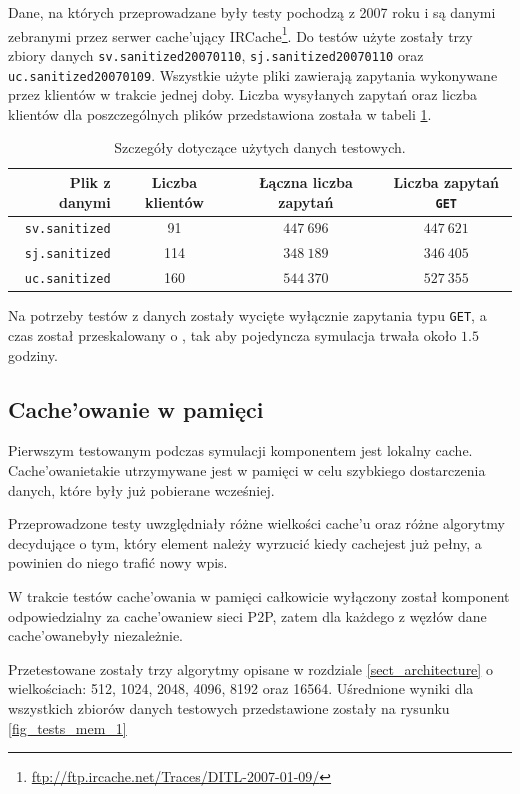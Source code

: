 \documentclass[a4paper,11pt]{scrartcl}
\newcommand{\f}{\texttt}
\newcommand{\s}{ }
\newcommand{\kesz}{cache}
\newcommand{\keszu}{cache'u}
\newcommand{\keszujacy}{cache'ujący}
\newcommand{\keszowania}{cache'owania}
\newcommand{\keszowane}{cache'owane}
\newcommand{\keszowanie}{cache'owanie}
\newcommand{\Keszowanie}{Cache'owanie}
\begin{document}
Dane, na których przeprowadzane były testy pochodzą z 2007 roku i są danymi zebranymi przez serwer \keszujacy\s IRCache\footnote{\url{ftp://ftp.ircache.net/Traces/DITL-2007-01-09/}}. Do testów użyte zostały trzy zbiory danych \f{sv.sanitized20070110}, \f{sj.sanitized20070110} oraz \f{uc.sanitized20070109}.
Wszystkie użyte pliki zawierają zapytania wykonywane przez klientów w trakcie jednej doby. Liczba wysyłanych zapytań oraz liczba klientów dla poszczególnych plików przedstawiona została w tabeli \ref{tab_testdata}.

\begin{table}[h!]
\centering
\begin{tabular}{r c c c}
Plik z danymi & Liczba klientów & Łączna liczba zapytań & Liczba zapytań \f{GET}\\
\hline
\f{sv.sanitized} & 91 & $447~696$ & $447~621$\\
\f{sj.sanitized} & 114 & $348~189$ & $346~405$\\
\f{uc.sanitized} & 160 & $544~370$ & $527~355$\\
\end{tabular}
\caption{Szczegóły dotyczące użytych danych testowych.}
\label{tab_testdata}
\end{table}

Na potrzeby testów z danych zostały wycięte wyłącznie zapytania typu \f{GET}, a czas został przeskalowany o , tak aby pojedyncza symulacja trwała około $1.5$ godziny.

\subsection{\Keszowanie\s w pamięci}
Pierwszym testowanym podczas symulacji komponentem jest lokalny \kesz. \Keszowanie takie utrzymywane jest w pamięci w celu szybkiego dostarczenia danych, które były już pobierane wcześniej.

Przeprowadzone testy uwzględniały różne wielkości \keszu\s oraz różne algorytmy decydujące o tym, który element należy wyrzucić kiedy \kesz jest już pełny, a powinien do niego trafić nowy wpis.

W trakcie testów \keszowania\s w pamięci całkowicie wyłączony został komponent odpowiedzialny za \keszowanie w sieci P2P, zatem dla każdego z węzłów dane \keszowane były niezależnie.

Przetestowane zostały trzy algorytmy opisane w rozdziale \ref{sect_architecture} o wielkościach: 512, 1024, 2048, 4096, 8192 oraz 16564. Uśrednione wyniki dla wszystkich zbiorów danych testowych przedstawione zostały na rysunku \ref{fig_tests_mem_1}
\end{document}
